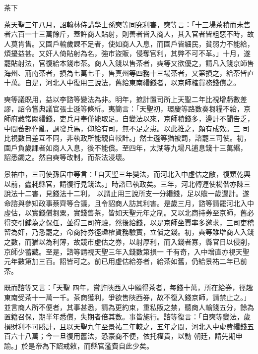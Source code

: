
\begin{pinyinscope}

 茶下



 茶天聖三年八月，詔翰林侍講學士孫奭等同究利害，奭等言：「十三場茶積而未售者六百一十三萬餘斤，蓋許商人貼射，則善者皆入商人，其入官者皆粗惡不時，故人莫肯售。又園戶輸歲課不足者，使如商人入息，而園戶皆細民，貧弱力不能給，煩擾益甚。又奸人倚貼射為名，強市盜販，侵奪官利，其弊不可不革。」十月，遂罷貼射法，官復給本錢市茶。商人入錢以售茶者，奭等又欲優之，請凡入錢京師售海州、荊南茶者，損為七萬七千，售真州等四務十三場茶者，又第損之，給茶皆直十萬。自是，河北入中復用三說法，舊給東南緡錢者，以京師榷貨務錢償之。



 奭等議既用，益以李諮等變法為非。明年，摭計置司所上天聖二年比視增虧數差謬，詔令嘗典議官張士遜等條析。夷簡言：「天聖初，環慶等路數奏芻糧不給，京師府藏常闕緡錢，吏兵月奉僅能取足。自變法以來，京師積錢多，邊計不聞告乏，中間蕃部作亂，調發兵馬，仰給有司，無不足之患。以此推之，頗有成效。三
 司比視數目差互不同，非執政所能親自較計。」然士遜等猶被罰，諮罷三司使。初，園戶負歲課者如商人入息，後不能償。至四年，太湖等九場凡逋息錢十三萬緡，
 詔悉蠲之。然自奭等改制，而茶法浸壞。



 景祐中，三司使孫居中等言：「自天聖三年變法，而河北入中虛估之敝，復類乾興以前，蠹耗縣官，請復行見錢法。」時諮已執政矣。三年，河北轉運使楊偕亦陳三說法十二害，見錢法十二利，
 以謂止用三說所支一分緡錢，足以贍一歲邊計。遂命諮與參知政事蔡齊等合議，且令詔商人訪其利害。是歲三月，諮等請罷河北入中虛估，以實錢償芻粟，實錢售茶，皆如天聖元年之制。又以北商持券至京師，舊必得交引鋪為之保任，並得三司符驗，然後給錢，以是京師坐賈率多邀求，三司吏稽留為奸，乃悉罷之，命商持券徑趣榷貨務驗實，立償之錢。初，奭等雖增商人入錢之數，而猶以為利薄，故競市虛估之券，以射厚利，而入錢者寡，縣官日以侵削，京師少蓄藏。至是，諮等請視天聖三年入錢數第損一
 千有奇，入中增直亦視天聖元年數第加三百。詔皆可之。前已用虛估給券者，給茶如舊，仍給景祐二年已前茶。



 既而諮等又言：「天聖
 四年，嘗許陜西入中願得茶者，每錢十萬，所在給券，徑趣東南受茶十一萬一千。茶商獲利，爭欲售陜西券，故不復入錢京師，請禁止之。」並言商人所不便者，其事甚悉，請為更約束，重私販之禁，聽商人輸錢五分，餘為置籍召保，期半年悉償，失期者倍其數。事皆施行。諮等復言：「自奭等變法，歲損財利不可勝計，且以天聖九年至景祐二年較之，五年之間，河北入中虛費緡錢五百六十八萬；今一旦復用舊法，恐豪商不便，依托權貴，以動
 朝廷，請先期申諭。」於是帝為下詔戒敕，而縣官濫費自此少矣。




\end{pinyinscope}
